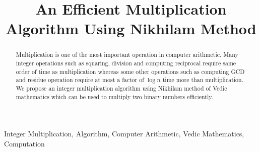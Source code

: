 \documentclass[conference]{IEEEtran}
\begin{document}
\title{An Efficient Multiplication Algorithm Using Nikhilam Method}
\author{
}

\maketitle


\begin{abstract}
Multiplication is one of the most important operation in computer arithmetic. Many integer operations such as squaring, division and computing reciprocal require same order of time as multiplication whereas some other operations such as computing GCD and residue operation require at most a factor of $\log n$ time more than multiplication. We propose an integer multiplication algorithm using Nikhilam method of Vedic mathematics which can be used to multiply two binary numbers efficiently.
\end{abstract}

\begin{keywords}
 Integer Multiplication, Algorithm, Computer Arithmetic, Vedic Mathematics, Computation
\end{keywords}

 
\IEEEpeerreviewmaketitle
\end{document}

